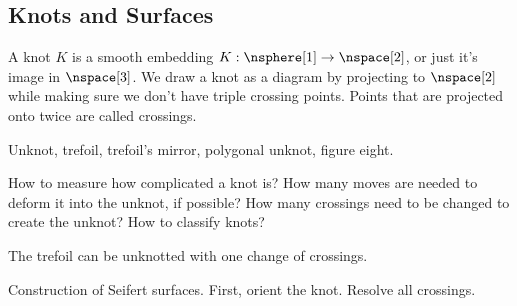     \subsection{Knots and Surfaces}
        \begin{definition}
            A knot $K$ is a smooth embedding
            $K:\nsphere[1]\rightarrow\nspace[2]$, or just it's image in
            $\nspace[3]$. We draw a knot as a diagram by projecting to
            $\nspace[2]$ while making sure we don't have triple crossing points.
            Points that are projected onto twice are called crossings.
        \end{definition}
        \begin{example}
            Unknot, trefoil, trefoil's mirror, polygonal unknot, figure eight.
        \end{example}
        How to measure how complicated a knot is? How many moves are needed
        to deform it into the unknot, if possible? How many crossings need
        to be changed to create the unknot? How to classify knots?
        \begin{example}
            The trefoil can be unknotted with one change of crossings.
        \end{example}
        Construction of Seifert surfaces. First, orient the knot. Resolve all
        crossings.